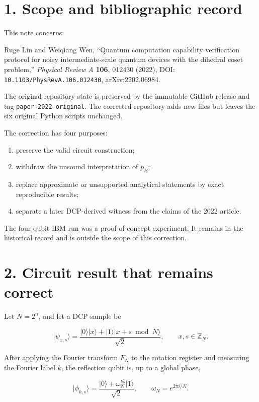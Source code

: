 \documentclass[
  10pt,
]{article}
\providecommand{\tightlist}{%
  \setlength{\itemsep}{0pt}\setlength{\parskip}{0pt}}
\begin{document}
\section{1. Scope and bibliographic
record}\label{scope-and-bibliographic-record}

This note concerns:

Ruge Lin and Weiqiang Wen, ``Quantum computation capability verification protocol for noisy
intermediate-scale quantum devices with the dihedral coset problem,''
\emph{Physical Review A} \textbf{106}, 012430 (2022), DOI:
\texttt{10.1103/PhysRevA.106.012430}, arXiv:2202.06984.

The original repository state is preserved by the immutable GitHub
release and tag \texttt{paper-2022-original}. The corrected repository
adds new files but leaves the six original Python scripts unchanged.

The correction has four purposes:

\begin{enumerate}
\def\labelenumi{\arabic{enumi}.}
\tightlist
\item
  preserve the valid circuit construction;
\item
  withdraw the unsound interpretation of \(p_B\);
\item
  replace approximate or unsupported analytical statements by exact
  reproducible results;
\item
  separate a later DCP-derived witness from the claims of the 2022
  article.
\end{enumerate}

The four-qubit IBM run was a proof-of-concept experiment. It remains in
the historical record and is outside the scope of this correction.

\section{2. Circuit result that remains
correct}\label{circuit-result-that-remains-correct}

Let \(N=2^n\), and let a DCP sample be

\[
\lvert\psi_{x,s}\rangle
=
\frac{
\lvert0\rangle\lvert x\rangle
+
\lvert1\rangle\lvert x+s\bmod N\rangle
}{\sqrt2},
\qquad x,s\in\mathbb Z_N.
\]

After applying the Fourier transform \(F_N\) to the rotation register
and measuring the Fourier label \(k\), the reflection qubit is, up to a
global phase,

\[
\lvert\phi_{k,s}\rangle
=
\frac{\lvert0\rangle+\omega_N^{ks}\lvert1\rangle}{\sqrt2},
\qquad
\omega_N=e^{2\pi i/N}.
\]
\end{document}

